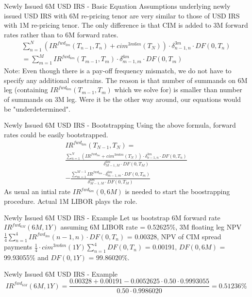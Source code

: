 \documentclass{beamer}
\begin{document}
\begin{frame}{Newly Issued 6M USD IRS - Basic Equation}
Assumptions underlying newly issued USD IRS with 6M re-pricing tenor are very similar to those of USD IRS with 1M re-pricing tenor. The only difference is that CIM is added to 3M forward rates rather than to 6M forward rates.
\begin{multline*}
\sum_{n = 1}^N \left(IR^{fwd_{3m}}(T_{n - 1}, T_n) + cim^{3m6m}(T_N) \right) \cdot \delta_{n - 1, n}^{3m} \cdot DF(0, T_n)\\
= \sum_{m = 1}^M IR^{fwd_{6m}}(T_{m - 1}, T_m) \cdot \delta_{m - 1, m}^{6m} \cdot DF(0, T_m)
\end{multline*}
Note: Even though there is a pay-off frequency mismatch, we do not have to specify any additional constrains. The reason is that number of summands on 6M leg (containing $IR^{fwd_{6m}}(T_{m - 1}, T_m)$ which we solve for) is smaller than number of summands on 3M leg. Were it be the other way around, our equations would be "underdetermined".
\end{frame}

\begin{frame}{Newly Issued 6M USD IRS - Bootstrapping}
Using the above formula, forward rates could be easily bootstrapped.
\begin{multline*}
IR^{fwd_{6m}}(T_{N-1}, T_N) =\\
\frac{\sum_{n = 1}^N \left(IR^{fwd_{3m}} + cim^{3m6m}(T_N) \right) \cdot \delta_{n - 1, n}^{3m} \cdot DF(0, T_n)}{\delta_{M - 1, M}^{6m} \cdot DF(0, T_M)}\\
- \frac{\sum_{m = 1}^{M -1} IR^{fwd_{6m}} \cdot \delta_{m - 1, m}^{6m} \cdot DF(0, T_m)}{\delta_{M - 1, M}^{6m} \cdot DF(0, T_M)}
\end{multline*}
As usual an intial rate $IR^{fwd_{6m}}(0, 6M)$ is needed to start the boostrapping procedure. Actual 1M LIBOR plays the role.
\end{frame}

\begin{frame}{Newly Issued 6M USD IRS - Example}
Let us bootstrap 6M forward rate $IR^{fwd_{6M}}(6M, 1Y)$ assuming 6M LIBOR rate = 0.52625\%, 3M floating leg NPV $\frac{1}{4}\sum_{n = 1}^4 IR^{fwd_{3m}}(n - 1, n) \cdot DF(0, T_n)$ = 0.00328, NPV of CIM spread payments $\frac{1}{4} \cdot cim^{3m6m}(1Y) \sum_{n = 1}^4 DF(0, T_n)$ = 0.00191, $DF(0, 6M)$ = 99.93055\% and $DF(0, 1Y)$ = 99.86020\%.
\end{frame}

\begin{frame}{Newly Issued 6M USD IRS - Example}
\begin{equation*}
IR^{fwd_{6M}}(6M, 1Y) = \frac{0.00328 + 0.00191 - 0.0052625 \cdot 0.50 \cdot 0.9993055}{0.50 \cdot 0.9986020} = 0.51236\%
\end{equation*}
\end{frame}
\end{document}
